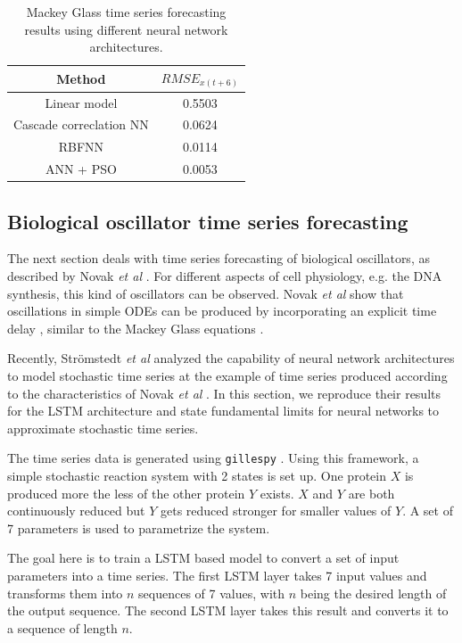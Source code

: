\documentclass{article}
\begin{document}
\begin{table}
  \centering
  \begin{tabular}{c|c}
    Method &  $RMSE_{x(t+6)}$ \\
    \hline
    Linear model & 0.5503 \\
    Cascade correclation NN & 0.0624 \\
    RBFNN & 0.0114 \\
    ANN + PSO \cite{caraballo2016} & 0.0053 \\
  \end{tabular}
  \caption{Mackey Glass time series forecasting results using different neural
  network architectures.}
  \label{tab:mackey_results}
\end{table}

\subsection{Biological oscillator time series forecasting}

The next section deals with time series forecasting of biological oscillators, 
as described by Novak \textit{et al} \cite{novak2008}. For different aspects of
cell physiology, e.g. the DNA synthesis, this kind of oscillators can be 
observed. Novak \textit{et al} show that oscillations in simple ODEs can be 
produced by incorporating an explicit time delay \cite{novak2008}, similar to 
the Mackey Glass equations \cite{mackey1977}.

Recently, Strömstedt \textit{et al} analyzed the capability of neural network
architectures to model stochastic time series \cite{stroemstedt2018} at the 
example of time series produced according to the characteristics of Novak 
\textit{et al} \cite{novak2008}. In this section, we reproduce their results for
the LSTM architecture and state fundamental limits for neural networks to 
approximate stochastic time series.


The time series data is generated using \texttt{gillespy} \cite{abel2016}.
Using this framework, a simple stochastic reaction system with 2 states is 
set up. One protein $X$ is produced more the less of the other protein $Y$
exists. $X$ and $Y$ are both continuously reduced but $Y$ gets reduced stronger
for smaller values of $Y$. A set of 7 parameters is used to parametrize the 
system.

The goal here is to train a LSTM based 
model to convert a set of input parameters into a time series. The first 
LSTM layer
takes 7 input values and transforms them into $n$ sequences of 7 values, with 
$n$ being the desired length of the output sequence. The second LSTM layer 
takes this result and converts it to a sequence of length $n$. 
\end{document}
